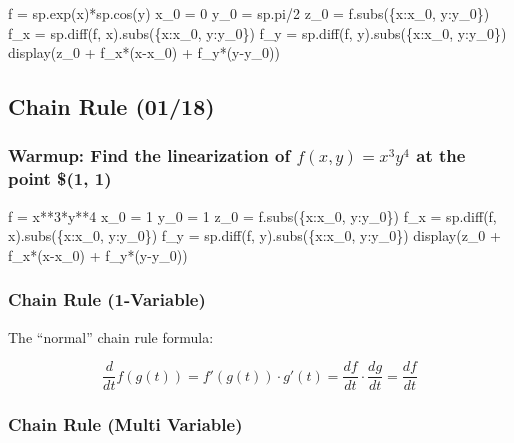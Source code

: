\documentclass[
  letterpaper,
  DIV=11,
  numbers=noendperiod]{scrartcl}
\newenvironment{Shaded}{\begin{snugshade}}{\end{snugshade}}
\newcommand{\NormalTok}[1]{\textcolor[rgb]{0.00,0.23,0.31}{#1}}
\begin{document}
\begin{Shaded}
\begin{Highlighting}[numbers=left,,]
\NormalTok{f = sp.exp(x)*sp.cos(y)}
\NormalTok{x\_0 = 0}
\NormalTok{y\_0 = sp.pi/2}
\NormalTok{z\_0 = f.subs(\{x:x\_0, y:y\_0\})}
\NormalTok{f\_x = sp.diff(f, x).subs(\{x:x\_0, y:y\_0\})}
\NormalTok{f\_y = sp.diff(f, y).subs(\{x:x\_0, y:y\_0\})}
\NormalTok{display(z\_0 + f\_x*(x{-}x\_0) + f\_y*(y{-}y\_0))}
\end{Highlighting}
\end{Shaded}

\subsection{Chain Rule (01/18)}\label{chain-rule-0118}

\subsubsection{\texorpdfstring{Warmup: Find the linearization of
\(f(x, y) = x^3y^4\) at the point \$(1,
1)}{Warmup: Find the linearization of f(x, y) = x\^{}3y\^{}4 at the point \$(1, 1)}}\label{warmup-find-the-linearization-of-fx-y-x3y4-at-the-point-1-1}

\begin{Shaded}
\begin{Highlighting}[numbers=left,,]
\NormalTok{f = x**3*y**4}
\NormalTok{x\_0 = 1}
\NormalTok{y\_0 = 1}
\NormalTok{z\_0 = f.subs(\{x:x\_0, y:y\_0\})}
\NormalTok{f\_x = sp.diff(f, x).subs(\{x:x\_0, y:y\_0\})}
\NormalTok{f\_y = sp.diff(f, y).subs(\{x:x\_0, y:y\_0\})}
\NormalTok{display(z\_0 + f\_x*(x{-}x\_0) + f\_y*(y{-}y\_0))}
\end{Highlighting}
\end{Shaded}

\subsubsection{Chain Rule (1-Variable)}\label{chain-rule-1-variable}

The ``normal'' chain rule formula:

\[
\frac{d}{dt}f(g(t))=f'(g(t))\cdot g'(t)
 = \frac{df}{dt}\cdot \frac{dg}{dt} = \frac{df}{dt}
\]

\subsubsection{Chain Rule (Multi
Variable)}\label{chain-rule-multi-variable}
\end{document}
